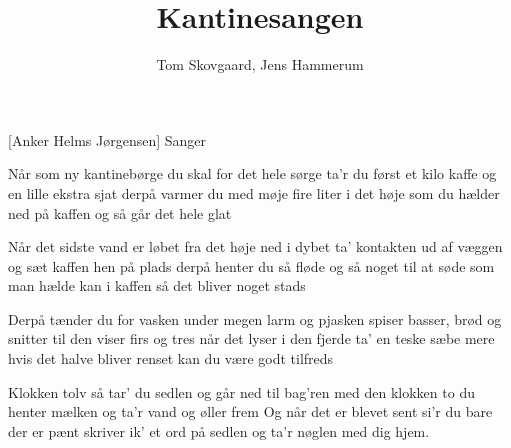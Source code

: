 \documentclass[a4paper,11pt]{article}
\title{Kantinesangen}
\author{Tom Skovgaard, Jens Hammerum}
\begin{document}
\maketitle

\begin{roles}
[Anker Helms Jørgensen] Sanger
\end{roles}

\begin{song}
Når som ny kantinebørge
du skal for det hele sørge
ta'r du først et kilo kaffe
og en lille ekstra sjat
derpå varmer du med møje
fire liter i det høje
som du hælder ned på kaffen
og så går det hele glat

Når det sidste vand er løbet
fra det høje ned i dybet
ta' kontakten ud af væggen
og sæt kaffen hen på plads
derpå henter du så fløde
og så noget til at søde
som man hælde kan i kaffen
så det bliver noget stads

Derpå tænder du for vasken
under megen larm og pjasken
spiser basser, brød og snitter
til den viser firs og tres
når det lyser i den fjerde
ta' en teske sæbe mere
hvis det halve bliver renset
kan du være godt tilfreds

Klokken tolv så tar' du sedlen
og går ned til bag'ren med den
klokken to du henter mælken
og ta'r vand og øller frem
Og når det er blevet sent
si'r du bare der er pænt
skriver ik' et ord på sedlen
og ta'r nøglen med dig hjem.
\end{song}
\end{document}
